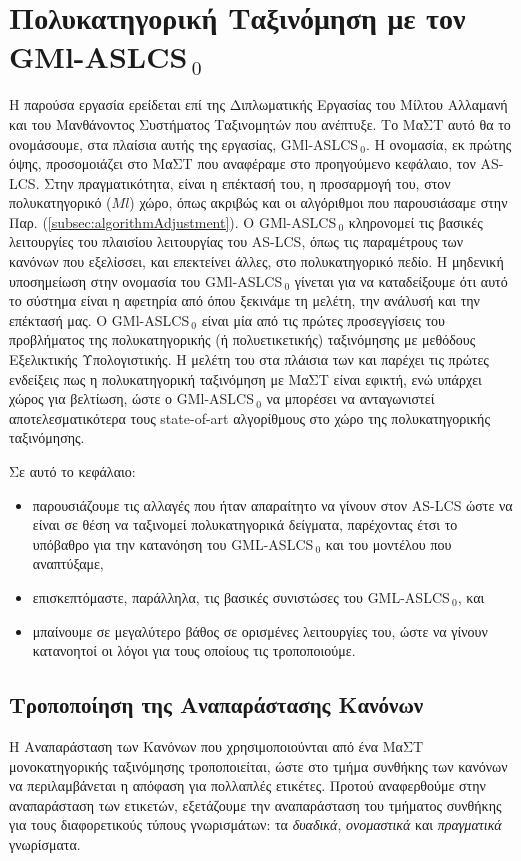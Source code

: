 \chapter{Πολυκατηγορική Ταξινόμηση με τον GMl-ASLCS$_{\:0}$}
\label{gmlaslcs0}
Η παρούσα εργασία ερείδεται επί της Διπλωματικής Εργασίας του Μίλτου Αλλαμανή \cite{allamanis11} και του Μανθάνοντος Συστήματος Ταξινομητών που ανέπτυξε. Το ΜαΣΤ αυτό θα το ονομάσουμε, στα πλαίσια αυτής της εργασίας, GMl-ASLCS$_{\:0}$. Η ονομασία, εκ πρώτης όψης, προσομοιάζει στο ΜαΣΤ που αναφέραμε στο προηγούμενο κεφάλαιο, τον AS-LCS. Στην πραγματικότητα, είναι η επέκτασή του, η προσαρμογή του, στον πολυκατηγορικό ($Ml$) χώρο, όπως ακριβώς και οι αλγόριθμοι που παρουσιάσαμε στην Παρ. (\ref{subsec:algorithmAdjustment}). Ο GMl-ASLCS$_{\:0}$ κληρονομεί τις  βασικές λειτουργίες του πλαισίου λειτουργίας του AS-LCS, όπως τις παραμέτρους των κανόνων που εξελίσσει, και επεκτείνει άλλες, στο πολυκατηγορικό πεδίο. Η μηδενική υποσημείωση στην ονομασία του GMl-ASLCS$_{\:0}$ γίνεται για να καταδείξουμε ότι αυτό το σύστημα είναι η αφετηρία από όπου ξεκινάμε τη μελέτη, την ανάλυσή και την επέκτασή μας. Ο GMl-ASLCS$_{\:0}$ είναι μία από τις πρώτες προσεγγίσεις του προβλήματος της πολυκατηγορικής (ή πολυετικετικής) ταξινόμησης με μεθόδους Εξελικτικής Υπολογιστικής. Η μελέτη του στα πλάισια των \cite{allamanis11} και \cite{DBLP:conf/icannga/allamanis13} παρέχει τις πρώτες ενδείξεις πως η πολυκατηγορική ταξινόμηση με ΜαΣΤ είναι εφικτή, ενώ υπάρχει χώρος για βελτίωση, ώστε ο GMl-ASLCS$_{\:0}$ να μπορέσει να ανταγωνιστεί αποτελεσματικότερα τους state-of-art αλγορίθμους στο χώρο της πολυκατηγορικής ταξινόμησης.


Σε αυτό το κεφάλαιο: 

\begin{itemize}
\item παρουσιάζουμε τις αλλαγές που ήταν απαραίτητο να γίνουν στον AS-LCS ώστε να είναι σε θέση να ταξινομεί πολυκατηγορικά δείγματα, παρέχοντας έτσι το υπόβαθρο για την κατανόηση του GML-ASLCS$_{\:0}$ και του μοντέλου που αναπτύξαμε,
\item επισκεπτόμαστε, παράλληλα, τις βασικές συνιστώσες του GML-ASLCS$_{\:0}$, και
\item μπαίνουμε σε μεγαλύτερο βάθος σε ορισμένες λειτουργίες του, ώστε να γίνουν κατανοητοί οι λόγοι για τους οποίους τις τροποποιούμε.
\end{itemize}

\section{Τροποποίηση της Αναπαράστασης Κανόνων}
Η Αναπαράσταση των Κανόνων που χρησιμοποιούνται από ένα ΜαΣΤ μονοκατηγορικής ταξινόμησης τροποποιείται, ώστε στο τμήμα συνθήκης των κανόνων να περιλαμβάνεται η απόφαση για πολλαπλές ετικέτες. Προτού αναφερθούμε στην αναπαράσταση των ετικετών, εξετάζουμε την αναπαράσταση του τμήματος συνθήκης για τους διαφορετικούς τύπους γνωρισμάτων: τα \emph{δυαδικά}, \emph{ονομαστικά} και \emph{πραγματικά} γνωρίσματα.

